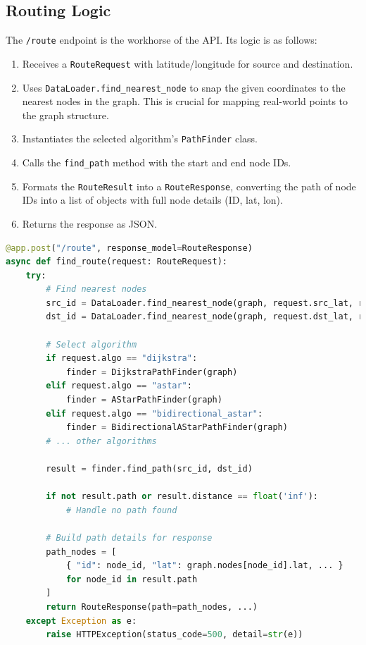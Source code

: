 \documentclass[12pt, a4paper]{report}
\begin{document}
\subsection{Routing Logic}
The \texttt{/route} endpoint is the workhorse of the API. Its logic is as follows:
\begin{enumerate}
    \item Receives a \texttt{RouteRequest} with latitude/longitude for source and destination.
    \item Uses \texttt{DataLoader.find\_nearest\_node} to snap the given coordinates to the nearest nodes in the graph. This is crucial for mapping real-world points to the graph structure.
    \item Instantiates the selected algorithm's \texttt{PathFinder} class.
    \item Calls the \texttt{find\_path} method with the start and end node IDs.
    \item Formats the \texttt{RouteResult} into a \texttt{RouteResponse}, converting the path of node IDs into a list of objects with full node details (ID, lat, lon).
    \item Returns the response as JSON.
\end{enumerate}

\begin{lstlisting}[language=Python, caption={Code Snippet: `/route' endpoint from `api.py'}, label={lst:route_endpoint}]
@app.post("/route", response_model=RouteResponse)
async def find_route(request: RouteRequest):
    try:
        # Find nearest nodes
        src_id = DataLoader.find_nearest_node(graph, request.src_lat, request.src_lon)
        dst_id = DataLoader.find_nearest_node(graph, request.dst_lat, request.dst_lon)

        # Select algorithm
        if request.algo == "dijkstra":
            finder = DijkstraPathFinder(graph)
        elif request.algo == "astar":
            finder = AStarPathFinder(graph)
        elif request.algo == "bidirectional_astar":
            finder = BidirectionalAStarPathFinder(graph)
        # ... other algorithms

        result = finder.find_path(src_id, dst_id)

        if not result.path or result.distance == float('inf'):
            # Handle no path found
        
        # Build path details for response
        path_nodes = [
            { "id": node_id, "lat": graph.nodes[node_id].lat, ... }
            for node_id in result.path
        ]
        return RouteResponse(path=path_nodes, ...)
    except Exception as e:
        raise HTTPException(status_code=500, detail=str(e))
\end{lstlisting}
\end{document}

